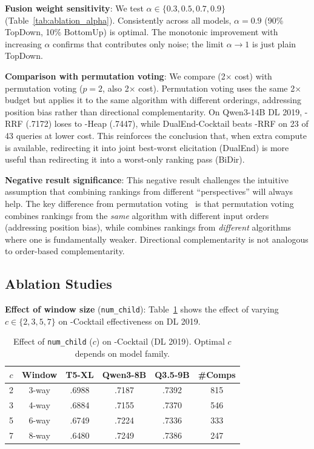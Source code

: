 \textbf{Fusion weight sensitivity}: We test $\alpha \in \{0.3, 0.5, 0.7, 0.9\}$ (Table~\ref{tab:ablation_alpha}). Consistently across all models, $\alpha=0.9$ (90\% TopDown, 10\% BottomUp) is optimal. The monotonic improvement with increasing $\alpha$ confirms that \bottomup{} contributes only noise; the limit $\alpha\to 1$ is just plain TopDown.

\textbf{Comparison with permutation voting}: We compare \bidir{} (2$\times$ cost) with permutation voting ($p=2$, also 2$\times$ cost). Permutation voting uses the same 2$\times$ budget but applies it to the same algorithm with different orderings, addressing position bias rather than directional complementarity. On Qwen3-14B DL 2019, \bidir{}-RRF (.7172) loses to \topdown{}-Heap (.7447), while DualEnd-Cocktail beats \bidir{}-RRF on 23 of 43 queries at lower cost. This reinforces the conclusion that, when extra compute is available, redirecting it into joint best-worst elicitation (DualEnd) is more useful than redirecting it into a worst-only ranking pass (BiDir).

\textbf{Negative result significance}: This negative result challenges the intuitive assumption that combining rankings from different ``perspectives'' will always help. The key difference from permutation voting~\citep{zhuang2024setwise} is that permutation voting combines rankings from the \emph{same} algorithm with different input orders (addressing position bias), while \bidir{} combines rankings from \emph{different} algorithms where one is fundamentally weaker. Directional complementarity is not analogous to order-based complementarity.


\subsection{Ablation Studies}
\label{sec:ablation}

\textbf{Effect of window size} (\texttt{num\_child}): Table~\ref{tab:ablation_nc} shows the effect of varying $c \in \{2, 3, 5, 7\}$ on \dualend{}-Cocktail effectiveness on DL 2019.

\begin{table}[!htbp]
\caption{Effect of \texttt{num\_child} ($c$) on \dualend{}-Cocktail (DL 2019). Optimal $c$ depends on model family.}
\label{tab:ablation_nc}
\small
\begin{tabular}{cccccc}
\toprule
$c$ & Window & T5-XL & Qwen3-8B & Q3.5-9B & \#Comps \\
\midrule
2 & 3-way & .6988 & .7187 & .7392 & 815 \\
3 & 4-way & .6884 & .7155 & .7370 & 546 \\
5 & 6-way & .6749 & .7224 & .7336 & 333 \\
7 & 8-way & .6480 & .7249 & .7386 & 247 \\
\bottomrule
\end{tabular}
\end{table}

